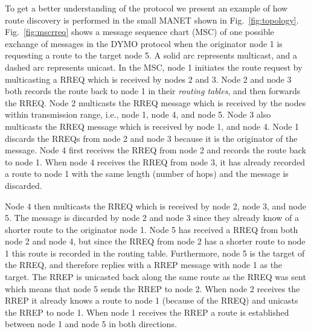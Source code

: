 To get a better understanding of the protocol we present an example of how route discovery is performed in the small MANET shown in Fig.~\ref{fig:topology}. Fig.~\ref{fig:mscrreq} shows a message sequence chart (MSC) of one possible exchange of messages in the DYMO protocol when the originator node 1 is requesting a route to the target node 5. A solid arc represents multicast, and a dashed arc represents unicast. In the MSC, node 1 initiates the route request by multicasting a RREQ which is received by nodes 2 and 3. Node 2 and node 3 both records the route back to node 1 in their \emph{routing tables}, and then forwards the RREQ. Node 2 multicasts the RREQ message which is received by the nodes within transmission range, i.e., node 1, node 4, and node 5. Node 3 also multicasts the RREQ message which is received by node 1, and node 4. Node 1 discards the RREQs from node 2 and node 3 because it is the originator of the message. Node 4 first receives the RREQ from node 2 and records the route back to node 1. When node 4 receives the RREQ from node 3, it has already recorded a route to node 1 with the same length (number of hops) and the message is discarded.

Node 4 then multicasts the RREQ which is received by node 2, node 3, and node 5. The message is discarded by node 2 and node 3 since they already know of a shorter route to the originator node 1. Node 5 has received a RREQ from both node 2 and node 4, but since the RREQ from node 2 has a shorter route to node 1 this route is recorded in the routing table. Furthermore, node 5 is the target of the RREQ, and therefore replies with a RREP message with node 1 as the target. The RREP is unicasted back along the same route as the RREQ was sent which means that node 5 sends the RREP to node 2. When node 2 receives the RREP it already knows a route to node 1 (because of the RREQ) and unicasts the RREP to node 1. When node 1 receives the RREP a route is established between node 1 and node 5 in both directions.